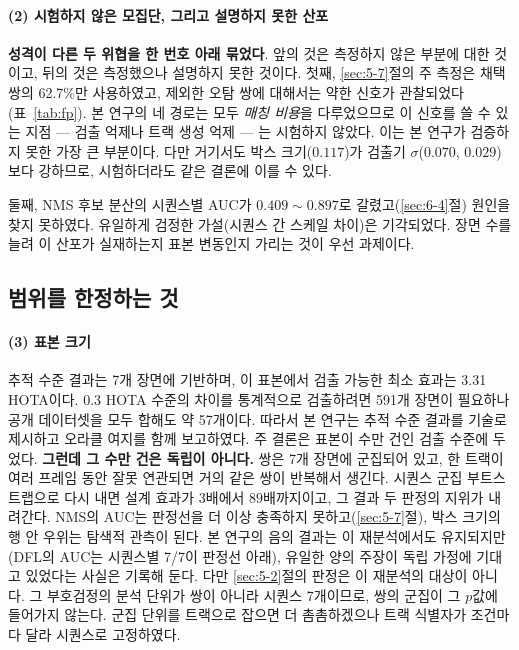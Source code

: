 \documentclass[12pt,a4paper,oneside]{report}
\begin{document}
\paragraph{(2) 시험하지 않은 모집단, 그리고 설명하지 못한 산포} \textbf{성격이 다른 두 위협을 한 번호 아래 묶었다}. 앞의 것은 측정하지 않은 부분에 대한 것이고, 뒤의 것은 측정했으나 설명하지 못한 것이다. 첫째, \ref{sec:5-7}절의 주 측정은 채택 쌍의 62.7\%만 사용하였고, 제외한 오탐 쌍에 대해서는 약한 신호가 관찰되었다(표~\ref{tab:fp}). 본 연구의 네 경로는 모두 \textit{매칭 비용}을 다루었으므로 이 신호를 쓸 수 있는 지점 --- 검출 억제나 트랙 생성 억제 --- 는 시험하지 않았다. 이는 본 연구가 검증하지 못한 가장 큰 부분이다. 다만 거기서도 박스 크기($0.117$)가 검출기 $\sigma$($0.070$, $0.029$)보다 강하므로, 시험하더라도 같은 결론에 이를 수 있다.

둘째, NMS 후보 분산의 시퀀스별 AUC가 $0.409 \sim 0.897$로 갈렸고(\ref{sec:6-4}절) 원인을 찾지 못하였다. 유일하게 검정한 가설(시퀀스 간 스케일 차이)은 기각되었다. 장면 수를 늘려 이 산포가 실재하는지 표본 변동인지 가리는 것이 우선 과제이다.

\subsection*{범위를 한정하는 것}

\paragraph{(3) 표본 크기} 추적 수준 결과는 7개 장면에 기반하며, 이 표본에서 검출 가능한 최소 효과는 3.31 HOTA이다. 0.3 HOTA 수준의 차이를 통계적으로 검출하려면 591개 장면이 필요하나 공개 데이터셋을 모두 합해도 약 57개이다. 따라서 본 연구는 추적 수준 결과를 기술로 제시하고 오라클 여지를 함께 보고하였다. 주 결론은 표본이 수만 건인 검출 수준에 두었다. \textbf{그런데 그 수만 건은 독립이 아니다.} 쌍은 7개 장면에 군집되어 있고, 한 트랙이 여러 프레임 동안 잘못 연관되면 거의 같은 쌍이 반복해서 생긴다. 시퀀스 군집 부트스트랩으로 다시 내면 설계 효과가 $3$배에서 $89$배까지이고, 그 결과 두 판정의 지위가 내려간다. NMS의 AUC는 판정선을 더 이상 충족하지 못하고(\ref{sec:5-7}절), 박스 크기의 행 안 우위는 탐색적 관측이 된다. 본 연구의 음의 결과는 이 재분석에서도 유지되지만(DFL의 AUC는 시퀀스별 7/7이 판정선 아래), 유일한 양의 주장이 독립 가정에 기대고 있었다는 사실은 기록해 둔다. 다만 \ref{sec:5-2}절의 판정은 이 재분석의 대상이 아니다. 그 부호검정의 분석 단위가 쌍이 아니라 시퀀스 7개이므로, 쌍의 군집이 그 $p$값에 들어가지 않는다. 군집 단위를 트랙으로 잡으면 더 촘촘하겠으나 트랙 식별자가 조건마다 달라 시퀀스로 고정하였다.
\end{document}
